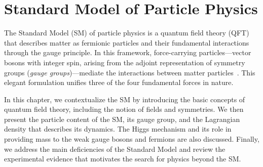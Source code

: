 \chapter{Standard Model of Particle Physics}\label{ch:sm}

The Standard Model (SM) of particle physics is a quantum field theory (QFT) that describes matter as fermionic particles and their fundamental interactions through the gauge principle. In this framework, force-carrying particles---vector bosons with integer spin, arising from the adjoint representation of symmetry groups (\textit{gauge groups})---mediate the interactions between matter particles~\parencite{greiner2000relativistic,pokorski2000gauge}. This elegant formulation unifies three of the four fundamental forces in nature.

In this chapter, we contextualize the SM by introducing the basic concepts of quantum field theory, including the notion of fields and symmetries. We then present the particle content of the SM, its gauge group, and the Lagrangian density that describes its dynamics. The Higgs mechanism and its role in providing mass to the weak gauge bosons and fermions are also discussed. Finally, we address the main deficiencies of the Standard Model and review the experimental evidence that motivates the search for physics beyond the SM.

